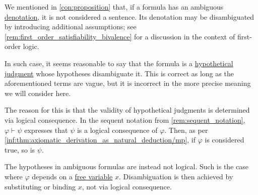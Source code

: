 \begin{remark}\label{rem:formulas_and_hypothetical_judgments}
  We mentioned in \cref{con:proposition} that, if a formula has an ambiguous \hyperref[con:denotation]{denotation}, it is not considered a sentence. Its denotation may be disambiguated by introducing additional assumptions; see \cref{rem:first_order_satisfiability_bivalence} for a discussion in the context of first-order logic.

  In such case, it seems reasonable to say that the formula is a \hyperref[con:hypothetical_judgment]{hypothetical judgment} whose hypotheses disambiguate it. This is correct as long as the aforementioned terms are vague, but it is incorrect in the more precise meaning we will consider here.

  The reason for this is that the validity of hypothetical judgments is determined via logical consequence. In the sequent notation from \cref{rem:sequent_notation}, \( \varphi \vdash \psi \) expresses that \( \psi \) is a logical consequence of \( \varphi \). Then, as per \ref{inf:thm:axiomatic_derivation_as_natural_deduction/mp}, if \( \varphi \) is considered true, so is \( \psi \).

  The hypotheses in ambiguous formulas are instead not logical. Such is the case where \( \varphi \) depends on a \hyperref[con:variable_binding]{free variable} \( x \). Disambiguation is then achieved by substituting or binding \( x \), not via logical consequence.
\end{remark}

